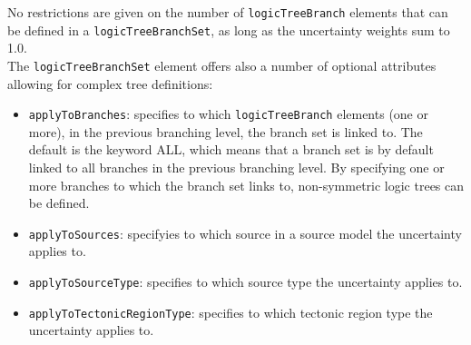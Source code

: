 No restrictions are given on the number of \Verb+logicTreeBranch+ elements that can be defined in a \Verb+logicTreeBranchSet+, as long as the uncertainty weights sum to 1.0.\\
The \Verb+logicTreeBranchSet+ element offers also a number of optional attributes allowing for complex tree definitions:
\begin{itemize}
\item \Verb+applyToBranches+: specifies to which \Verb+logicTreeBranch+ elements (one or more), in the previous branching level, the branch set is linked to. The default is the keyword ALL, which means that a branch set is by default linked to all branches in the previous branching level. By specifying one or more branches to which the branch set links to, non-symmetric logic trees can be defined.
\item \Verb+applyToSources+: specifyies to which source in a source model the uncertainty applies to.
\item \Verb+applyToSourceType+: specifies to which source type the uncertainty applies to.
\item \Verb+applyToTectonicRegionType+: specifies to which tectonic region type the uncertainty applies to.
\end{itemize}


